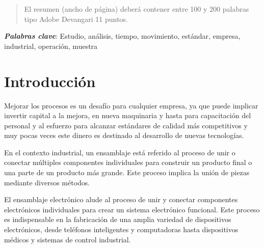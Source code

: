     \maketitle
    \thispagestyle{fancy}
    
    
    
    \begin{abstract}
    \noindent 
    El resumen (ancho de página) deberá contener entre 100 y 200 palabras tipo Adobe Devangari 11 puntos.
    
    \end{abstract}
    \textbf{\textit{Palabras clave}}: {Estudio, análisis, tiempo, movimiento, estándar, empresa, industrial, operación, muestra}
    
    \section{Introducción}
    
    Mejorar los procesos es un desafío para cualquier empresa, ya que puede implicar invertir capital a la mejora, en nueva maquinaria y hasta para capacitación del personal y al esfuerzo para alcanzar estándares de calidad más competitivos y muy pocas veces este dinero es destinado al desarrollo de nuevas tecnologías. \cite{83520408}
    
    
    En el contexto industrial, un ensamblaje está referido al proceso de unir o conectar múltiples componentes individuales para construir un producto final o una parte de un producto más grande. Este proceso implica la unión de piezas mediante diversos métodos.
    
    
    El ensamblaje electrónico alude al proceso de unir y conectar componentes electrónicos individuales para crear un sistema electrónico funcional. Este proceso es indispensable en la fabricación de una amplia variedad de dispositivos electrónicos, desde teléfonos inteligentes y computadoras hasta dispositivos médicos y sistemas de control industrial.
    
